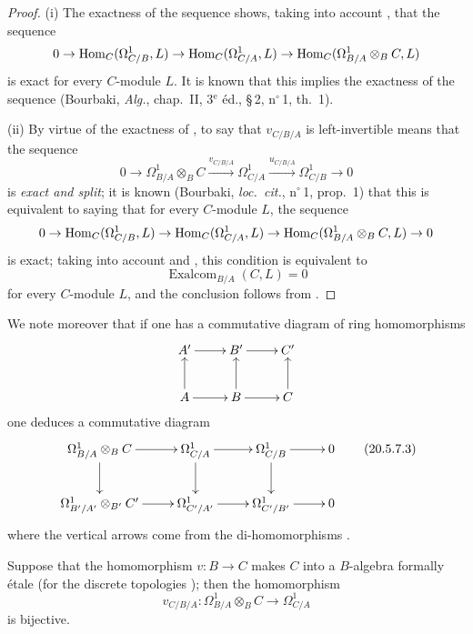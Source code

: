 \begin{proof}
(i) The exactness of the sequence  shows, taking into account , that the sequence
\[
  0\to\operatorname{Hom}_C(\Omega^1_{C/B},L)\to\operatorname{Hom}_C(\Omega^1_{C/A},L)\to\operatorname{Hom}_C(\Omega^1_{B/A}\otimes_B C,L)
\]
is exact for every $C$-module $L$.
It is known that this implies the exactness of the sequence  (Bourbaki, \emph{Alg.}, chap.~II, 3$^\text{e}$ \'{e}d., \S\,2, n$^\circ$\,1, th.~1).

\medskip
(ii) By virtue of the exactness of , to say that $v_{C/B/A}$ is left-invertible means that the sequence
\begin{equation}
\tag{20.5.7.2}
  \label{0.20.5.7.2}
  0\to\Omega^1_{B/A}\otimes_B C\xrightarrow{v_{C/B/A}}\Omega^1_{C/A}\xrightarrow{u_{C/B/A}}\Omega^1_{C/B}\to 0
\end{equation}
is \emph{exact and split}; it is known (Bourbaki, \emph{loc.\ cit.}, n$^\circ$\,1, prop.~1) that this is equivalent to saying that for every $C$-module $L$, the sequence
\[
  0\to\operatorname{Hom}_C(\Omega^1_{C/B},L)\to\operatorname{Hom}_C(\Omega^1_{C/A},L)\to\operatorname{Hom}_C(\Omega^1_{B/A}\otimes_B C,L)\to 0
\]
is exact; taking into account  and , this condition is equivalent to
\[
  \operatorname{Exalcom}_{B/A}(C,L)=0
\]
for every $C$-module $L$, and the conclusion follows from .
\end{proof}

We note moreover that if one has a commutative diagram of ring homomorphisms
\[
\xymatrix{
  A' \ar[r] & B' \ar[r] & C' \\
  A \ar[u] \ar[r] & B \ar[u] \ar[r] & C \ar[u]
}
\]
one deduces a commutative diagram
\[
\xymatrix{
  \Omega^1_{B/A}\otimes_B C \ar[r] \ar[d] & \Omega^1_{C/A} \ar[r] \ar[d] & \Omega^1_{C/B} \ar[r] \ar[d] & 0 \\
  \Omega^1_{B'/A'}\otimes_{B'} C' \ar[r] & \Omega^1_{C'/A'} \ar[r] & \Omega^1_{C'/B'} \ar[r] & 0
}
\tag{20.5.7.3}
  \label{0.20.5.7.3}
\]
where the vertical arrows come from the di-homomorphisms .

\begin{corollary}[20.5.8]
\label{0.20.5.8}
Suppose that the homomorphism $v:B\to C$ makes $C$ into a $B$-algebra formally \'{e}tale \textup{(}for the discrete topologies \textup{)}; then the homomorphism 
\[
  v_{C/B/A}:\Omega^1_{B/A}\otimes_B C\to\Omega^1_{C/A}
\]
is bijective.
\end{corollary}

